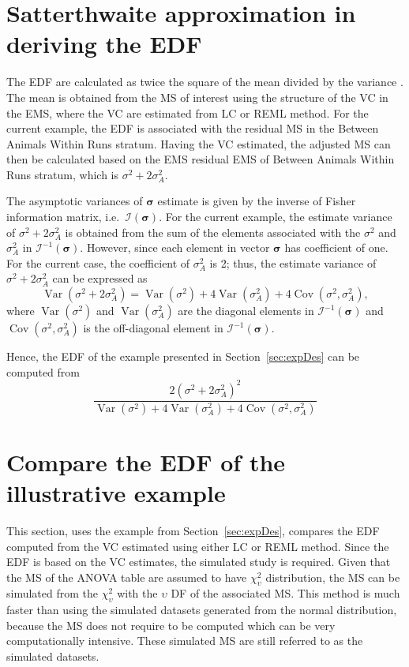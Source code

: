 \documentclass[12pt,a4paper]{article}
\begin{document}
\section{Satterthwaite approximation in deriving the EDF}
\label{sec:estEDF}
The EDF are calculated as twice the square of the mean divided by the variance \citep{Satterthwaite1946, Jarrett2008}. The mean is obtained from the MS of interest using the structure of the VC in the EMS, where the VC are estimated from LC or REML method. For the current example, the EDF is associated with the residual MS in the Between Animals Within Runs stratum. Having the VC estimated, the adjusted MS can then be calculated based on the EMS residual EMS of Between Animals Within Runs stratum, which is $\sigma^2 + 2\sigma_A^2$.
 
The asymptotic variances of $\bm{\sigma}$ estimate is given by the inverse of  Fisher information matrix, i.e.\ $\mathcal{I}(\bm{\sigma})$. For the current example, the estimate variance of $\sigma^2 + 2\sigma_A^2$ is obtained from the sum of the elements associated with the $\sigma^2$ and $\sigma_A^2$ in $\mathcal{I}^{-1}(\bm{\sigma}).$ However, since each element in vector $\bm{\sigma}$ has coefficient of one. For the current case, the coefficient of $\sigma_A^2$ is 2; thus, the estimate variance of $\sigma^2 + 2\sigma_A^2$ can be expressed as  
\[ \operatorname{Var}(\sigma^2 + 2\sigma_A^2) = \operatorname{Var}(\sigma^2) + 4\operatorname{Var}(\sigma_A^2) + 4\operatorname{Cov}(\sigma^2,\sigma_A^2),\] where $\operatorname{Var}(\sigma^2)$ and $\operatorname{Var}(\sigma_A^2)$ are the diagonal elements in $\mathcal{I}^{-1}(\bm{\sigma})$ and $\operatorname{Cov}(\sigma^2,\sigma_A^2)$ is the off-diagonal element in $\mathcal{I}^{-1}(\bm{\sigma})$.
 
Hence, the EDF of the example presented in Section~\ref{sec:expDes} can be computed from 
\[\dfrac{2(\sigma^2 + 2\sigma_A^2)^2}{\operatorname{Var}(\sigma^2) + 4\operatorname{Var}(\sigma_A^2) + 4\operatorname{Cov}(\sigma^2,\sigma_A^2)}\]

\section{Compare the EDF of the illustrative example}
\label{sec:edfExample}
This section, uses the example from Section~\ref{sec:expDes}, compares the EDF computed from the VC estimated using either LC or REML method. Since the EDF is based on the VC estimates, the simulated study is required. Given that the MS of the ANOVA table are assumed to have $\chi_{\upsilon}^2$ distribution, the MS can be simulated from the $\chi_{\upsilon}^2$ with the $\upsilon$ DF of the associated MS. This method is much faster than using the simulated datasets generated from the normal distribution, because the MS does not require to be computed which can be very computationally intensive. These simulated MS are still referred to as the simulated datasets. 
\end{document}
